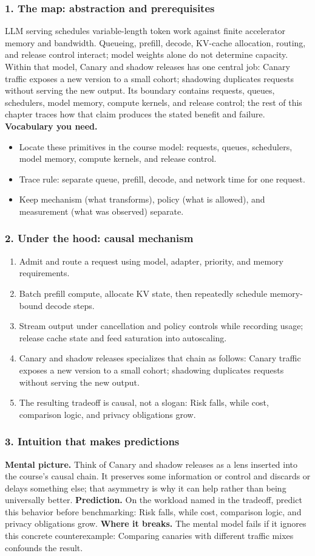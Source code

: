 \subsubsection*{1. The map: abstraction and prerequisites}
LLM serving schedules variable-length token work against finite accelerator memory and bandwidth. Queueing, prefill, decode, KV-cache allocation, routing, and release control interact; model weights alone do not determine capacity.
Within that model, Canary and shadow releases has one central job: Canary traffic exposes a new version to a small cohort; shadowing duplicates requests without serving the new output. Its boundary contains requests, queues, schedulers, model memory, compute kernels, and release control; the rest of this chapter traces how that claim produces the stated benefit and failure.
\textbf{Vocabulary you need.}\begin{itemize}
\item Locate these primitives in the course model: requests, queues, schedulers, model memory, compute kernels, and release control.
\item Trace rule: separate queue, prefill, decode, and network time for one request.
\item Keep mechanism (what transforms), policy (what is allowed), and measurement (what was observed) separate.
\end{itemize}
\subsubsection*{2. Under the hood: causal mechanism}\begin{enumerate}
\item Admit and route a request using model, adapter, priority, and memory requirements.
\item Batch prefill compute, allocate KV state, then repeatedly schedule memory-bound decode steps.
\item Stream output under cancellation and policy controls while recording usage; release cache state and feed saturation into autoscaling.
\item Canary and shadow releases specializes that chain as follows: Canary traffic exposes a new version to a small cohort; shadowing duplicates requests without serving the new output.
\item The resulting tradeoff is causal, not a slogan: Risk falls, while cost, comparison logic, and privacy obligations grow.
\end{enumerate}
\subsubsection*{3. Intuition that makes predictions}
\textbf{Mental picture.} Think of Canary and shadow releases as a lens inserted into the course's causal chain. It preserves some information or control and discards or delays something else; that asymmetry is why it can help rather than being universally better.
\textbf{Prediction.} On the workload named in the tradeoff, predict this behavior before benchmarking: Risk falls, while cost, comparison logic, and privacy obligations grow.
\textbf{Where it breaks.} The mental model fails if it ignores this concrete counterexample: Comparing canaries with different traffic mixes confounds the result.
